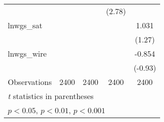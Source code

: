 \documentclass[a4paper, 12pt]{article}
\theoremstyle{definition}
\begin{document}
\begin{table}[htbp]
\begin{tabular}{l*{4}{c}}
		&                     &                     &      (2.78)         &                     \\
		[1em]
		lnwgs\_sat           &                     &                     &                     &       1.031         \\
		&                     &                     &                     &      (1.27)         \\
		[1em]
		lnwgs\_wire          &                     &                     &                     &      -0.854         \\
		&                     &                     &                     &     (-0.93)         \\
		\hline
		Observations        &        2400         &        2400         &        2400         &        2400         \\
		\hline\hline
		\multicolumn{5}{l}{\footnotesize \textit{t} statistics in parentheses}\\
		\multicolumn{5}{l}{\footnotesize \sym{*} \(p<0.05\), \sym{**} \(p<0.01\), \sym{***} \(p<0.001\)}\\
	\end{tabular}
\end{table}
\end{document}
